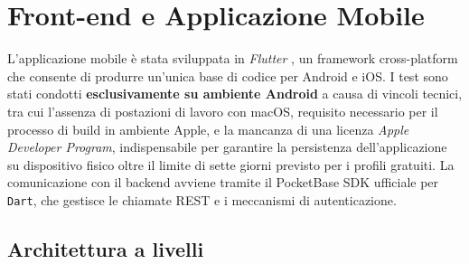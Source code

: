 \documentclass[12pt,a4paper]{article}
\begin{document}

\section{Front-end e Applicazione Mobile}

L'applicazione mobile è stata sviluppata 
in \textit{Flutter} \cite{flutter}, un framework
cross-platform che consente di produrre un'unica 
base di codice per Android e iOS.
I test sono stati condotti \textbf{esclusivamente su 
ambiente Android} a causa di vincoli tecnici, 
tra cui l'assenza di postazioni di lavoro con macOS, 
requisito necessario per il processo di build in ambiente Apple, 
e la mancanza di una licenza \textit{Apple Developer Program}, 
indispensabile per garantire la persistenza dell'applicazione 
su dispositivo fisico oltre il limite di sette 
giorni previsto per i profili gratuiti.
La comunicazione con il backend avviene tramite 
il PocketBase SDK ufficiale per \texttt{Dart}, 
che gestisce le chiamate REST e i meccanismi di autenticazione.


\subsection{Architettura a livelli}
\end{document}
